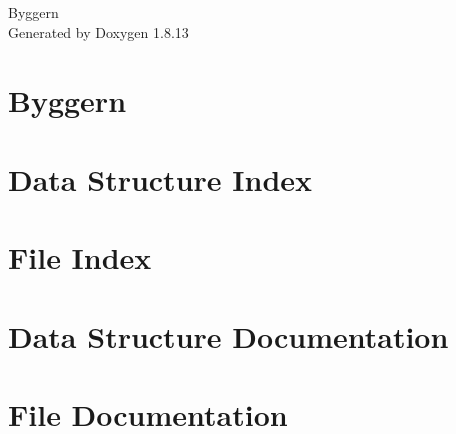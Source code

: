 \documentclass[twoside]{book}
\newcommand{\+}{\discretionary{\mbox{\scriptsize$\hookleftarrow$}}{}{}}
\newcommand{\clearemptydoublepage}{%
  \newpage{\pagestyle{empty}\cleardoublepage}%
}
\begin{document}
\hypersetup{pageanchor=false,
             bookmarksnumbered=true,
             pdfencoding=unicode
            }
\begin{titlepage}
\vspace*{7cm}
\begin{center}%
{\Large Byggern }\\
\vspace*{1cm}
{\large Generated by Doxygen 1.8.13}\\
\end{center}
\end{titlepage}
\clearemptydoublepage
{}
\tableofcontents
\clearemptydoublepage
{}
\hypersetup{pageanchor=true}

\chapter{Byggern}
\label{md_Node1_README}

\chapter{Data Structure Index}

\chapter{File Index}

\chapter{Data Structure Documentation}









\chapter{File Documentation}












































\backmatter
\newpage
{}
\clearemptydoublepage
{}
\printindex
\end{document}
